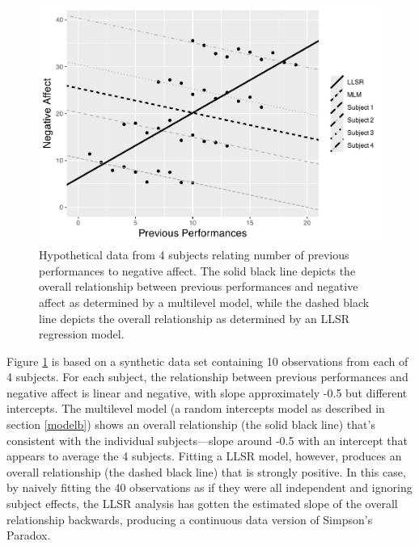 \documentclass[
]{krantz}
\begin{document}
\begin{figure}

{\centering \includegraphics[width=0.6\linewidth]{bookdown-BeyondMLR_files/figure-latex/mli-spag2-1} 

}

\caption{Hypothetical data from 4 subjects relating number of previous performances to negative affect.  The solid black line depicts the overall relationship between previous performances and negative affect as determined by a multilevel model, while the dashed black line depicts the overall relationship as determined by an LLSR regression model.}\label{fig:mli-spag2}
\end{figure}

Figure \ref{fig:mli-spag2} is based on a synthetic data set containing 10 observations from each of 4 subjects. For each subject, the relationship between previous performances and negative affect is linear and negative, with slope approximately -0.5 but different intercepts. The multilevel model (a random intercepts model as described in section \ref{modelb}) shows an overall relationship (the solid black line) that's consistent with the individual subjects---slope around -0.5 with an intercept that appears to average the 4 subjects. Fitting a LLSR model, however, produces an overall relationship (the dashed black line) that is strongly positive. In this case, by naively fitting the 40 observations as if they were all independent and ignoring subject effects, the LLSR analysis has gotten the estimated slope of the overall relationship backwards, producing a continuous data version of Simpson's Paradox.
\end{document}
